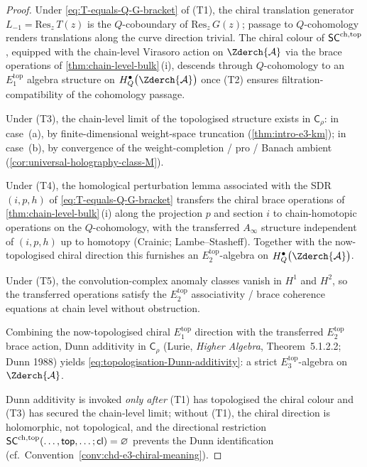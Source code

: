 \begin{proof}
Under \eqref{eq:T-equals-Q-G-bracket} of \textup{(T1)}, the chiral
translation generator $L_{-1} = \mathrm{Res}_{z}\, T(z)$ is the
$Q$-coboundary of $\mathrm{Res}_{z}\, G(z)$; passage to $Q$-cohomology
renders translations along the curve direction trivial.  The
chiral colour of $\mathsf{SC}^{\mathrm{ch},\mathrm{top}}$, equipped with the chain-level Virasoro
action on $\Zderch{\cA}$ via the brace operations of
\cref{thm:chain-level-bulk}\,(i), descends through $Q$-cohomology
to an $E_{1}^{\mathrm{top}}$ algebra structure on
$H^{\bullet}_{Q}\bigl(\Zderch{\cA}\bigr)$ once \textup{(T2)} ensures
filtration-compatibility of the cohomology passage.

Under \textup{(T3)}, the chain-level limit of the topologised
structure exists in $\mathsf{C}_{\rho}$: in case~\textup{(a)}, by
finite-dimensional weight-space truncation
(\cref{thm:intro-e3-km}); in case~\textup{(b)}, by convergence of
the weight-completion / pro / Banach ambient
(\cref{cor:universal-holography-class-M}).

Under \textup{(T4)}, the homological perturbation lemma associated
with the SDR $(i, p, h)$ of \eqref{eq:T-equals-Q-G-bracket} transfers
the chiral brace operations of \cref{thm:chain-level-bulk}\,(i)
along the projection $p$ and section $i$ to chain-homotopic
operations on the $Q$-cohomology, with the transferred $A_{\infty}$
structure independent of $(i, p, h)$ up to homotopy
(Crainic; Lambe--Stasheff).  Together with the now-topologised chiral
direction this furnishes an $E_{2}^{\mathrm{top}}$-algebra on
$H^{\bullet}_{Q}\bigl(\Zderch{\cA}\bigr)$.

Under \textup{(T5)}, the convolution-complex anomaly classes
vanish in $H^{1}$ and $H^{2}$, so the transferred operations satisfy
the $E_{2}^{\mathrm{top}}$ associativity / brace coherence equations
at chain level without obstruction.

Combining the now-topologised chiral $E_{1}^{\mathrm{top}}$ direction
with the transferred $E_{2}^{\mathrm{top}}$ brace action, Dunn
additivity in $\mathsf{C}_{\rho}$
(Lurie, \emph{Higher Algebra}, Theorem~5.1.2.2; Dunn 1988) yields
\eqref{eq:topologisation-Dunn-additivity}: a strict
$E_{3}^{\mathrm{top}}$-algebra on $\Zderch{\cA}$.

Dunn additivity is invoked \emph{only after} \textup{(T1)} has
topologised the chiral colour and \textup{(T3)} has secured the
chain-level limit; without \textup{(T1)}, the chiral direction is
holomorphic, not topological, and the directional restriction
$\mathsf{SC}^{\mathrm{ch},\mathrm{top}}(\ldots, \mathsf{top}, \ldots; \mathsf{cl}) = \varnothing$
prevents the Dunn identification (cf.\
Convention~\ref{conv:chd-e3-chiral-meaning}).
\end{proof}

